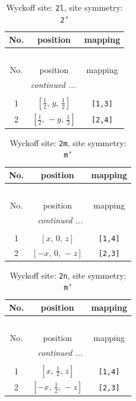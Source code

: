 \documentclass[fleqn,8pt]{jsarticle}
\begin{document}
\begin{longtable}{ccc}
\caption{Wyckoff site: {\tt 2l}, site symmetry: {\tt 2'}}
 \\
 \hline \hline
No. & position & mapping \\ \hline \endfirsthead

\multicolumn{2}{l}{\tablename\ \thetable{}} \\
 \hline \hline
No. & position & mapping \\ \hline \endhead

 \hline \hline
\multicolumn{2}{r}{\footnotesize\it continued ...} \\ \endfoot

 \hline \hline
\multicolumn{2}{r}{} \\ \endlastfoot

1 & $\left[ \frac{1}{2},\, y,\, \frac{1}{2} \right]$ & {\tt [1,3]} \\ \hline
2 & $\left[ \frac{1}{2},\, - y,\, \frac{1}{2} \right]$ & {\tt [2,4]} \\
\end{longtable}
\renewcommand{\arraystretch}{1.2}
\begin{longtable}{ccc}
\caption{Wyckoff site: {\tt 2m}, site symmetry: {\tt m'}}
 \\
 \hline \hline
No. & position & mapping \\ \hline \endfirsthead

\multicolumn{2}{l}{\tablename\ \thetable{}} \\
 \hline \hline
No. & position & mapping \\ \hline \endhead

 \hline \hline
\multicolumn{2}{r}{\footnotesize\it continued ...} \\ \endfoot

 \hline \hline
\multicolumn{2}{r}{} \\ \endlastfoot

1 & $\left[ x,\, 0,\, z \right]$ & {\tt [1,4]} \\ \hline
2 & $\left[ - x,\, 0,\, - z \right]$ & {\tt [2,3]} \\
\end{longtable}
\renewcommand{\arraystretch}{1.2}
\begin{longtable}{ccc}
\caption{Wyckoff site: {\tt 2n}, site symmetry: {\tt m'}}
 \\
 \hline \hline
No. & position & mapping \\ \hline \endfirsthead

\multicolumn{2}{l}{\tablename\ \thetable{}} \\
 \hline \hline
No. & position & mapping \\ \hline \endhead

 \hline \hline
\multicolumn{2}{r}{\footnotesize\it continued ...} \\ \endfoot

 \hline \hline
\multicolumn{2}{r}{} \\ \endlastfoot

1 & $\left[ x,\, \frac{1}{2},\, z \right]$ & {\tt [1,4]} \\ \hline
2 & $\left[ - x,\, \frac{1}{2},\, - z \right]$ & {\tt [2,3]} \\
\end{longtable}
\end{document}
